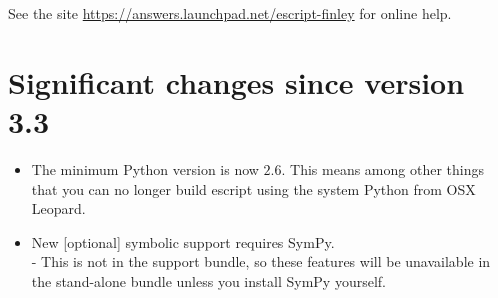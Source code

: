 See the site \url{https://answers.launchpad.net/escript-finley} for online help.

\section{Significant changes since version 3.3}
\begin{itemize}
 \item The minimum Python version is now $2.6$.   
This means among other things that you can no longer build escript using the system Python from OSX Leopard.
 \item New [optional] symbolic support requires SymPy.   \\- This is not in the support bundle, so these features will be unavailable in the
stand-alone bundle unless you install SymPy yourself.
\end{itemize}

% 






